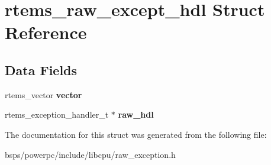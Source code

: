 \hypertarget{structrtems__raw__except__hdl}{}\section{rtems\+\_\+raw\+\_\+except\+\_\+hdl Struct Reference}
\label{structrtems__raw__except__hdl}
\subsection*{Data Fields}
\begin{DoxyCompactItemize}
\item 
\mbox{\label{structrtems__raw__except__hdl_a43dc9d83d453527cee8d2b6896054966}} 
rtems\+\_\+vector {\bfseries vector}
\item 
\mbox{\label{structrtems__raw__except__hdl_a6ecb823ee3b3ed03ea3810e1bc91051d}} 
rtems\+\_\+exception\+\_\+handler\+\_\+t $\ast$ {\bfseries raw\+\_\+hdl}
\end{DoxyCompactItemize}


The documentation for this struct was generated from the following file\+:\begin{DoxyCompactItemize}
\item 
bsps/powerpc/include/libcpu/raw\+\_\+exception.\+h\end{DoxyCompactItemize}
